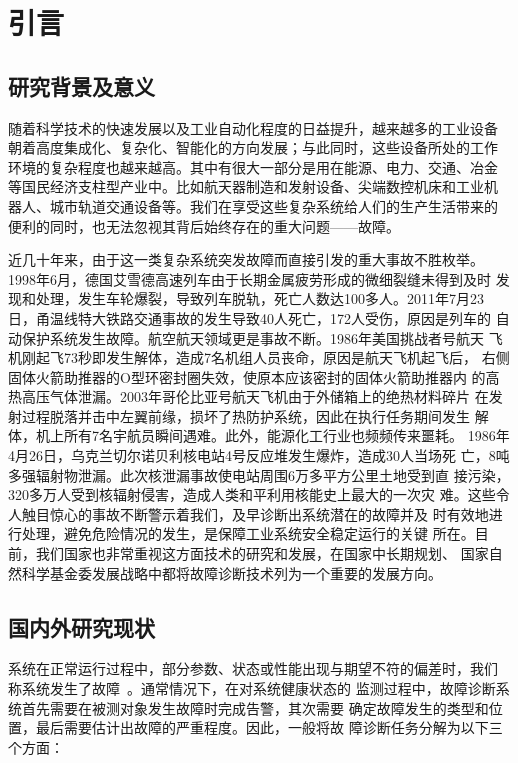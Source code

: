 \chapter{引言}
\label{cha:intro}

\section{研究背景及意义}

随着科学技术的快速发展以及工业自动化程度的日益提升，越来越多的工业设备
朝着高度集成化、复杂化、智能化的方向发展；与此同时，这些设备所处的工作
环境的复杂程度也越来越高。其中有很大一部分是用在能源、电力、交通、冶金
等国民经济支柱型产业中。比如航天器制造和发射设备、尖端数控机床和工业机
器人、城市轨道交通设备等。我们在享受这些复杂系统给人们的生产生活带来的
便利的同时，也无法忽视其背后始终存在的重大问题——故障。

近几十年来，由于这一类复杂系统突发故障而直接引发的重大事故不胜枚举。
1998年6月，德国艾雪德高速列车由于长期金属疲劳形成的微细裂缝未得到及时
发现和处理，发生车轮爆裂，导致列车脱轨，死亡人数达100多人。2011年7月23
日，甬温线特大铁路交通事故的发生导致40人死亡，172人受伤，原因是列车的
自动保护系统发生故障。航空航天领域更是事故不断。1986年美国挑战者号航天
飞机刚起飞73秒即发生解体，造成7名机组人员丧命，原因是航天飞机起飞后，
右侧固体火箭助推器的O型环密封圈失效，使原本应该密封的固体火箭助推器内
的高热高压气体泄漏。2003年哥伦比亚号航天飞机由于外储箱上的绝热材料碎片
在发射过程脱落并击中左翼前缘，损坏了热防护系统，因此在执行任务期间发生
解体，机上所有7名宇航员瞬间遇难。此外，能源化工行业也频频传来噩耗。
1986年4月26日，乌克兰切尔诺贝利核电站4号反应堆发生爆炸，造成30人当场死
亡，8吨多强辐射物泄漏。此次核泄漏事故使电站周围6万多平方公里土地受到直
接污染，320多万人受到核辐射侵害，造成人类和平利用核能史上最大的一次灾
难。这些令人触目惊心的事故不断警示着我们，及早诊断出系统潜在的故障并及
时有效地进行处理，避免危险情况的发生，是保障工业系统安全稳定运行的关键
所在。目前，我们国家也非常重视这方面技术的研究和发展，在国家中长期规划、
国家自然科学基金委发展战略中都将故障诊断技术列为一个重要的发展方向。

\section{国内外研究现状}

系统在正常运行过程中，部分参数、状态或性能出现与期望不符的偏差时，我们
称系统发生了故障~\cite{van1997remarks}。通常情况下，在对系统健康状态的
监测过程中，故障诊断系统首先需要在被测对象发生故障时完成告警，其次需要
确定故障发生的类型和位置，最后需要估计出故障的严重程度。因此，一般将故
障诊断任务分解为以下三个方面：

